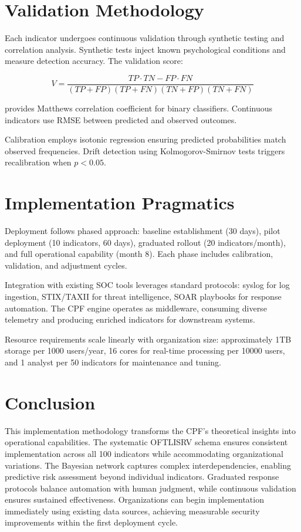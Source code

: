 \documentclass[10pt, twocolumn]{article}
\begin{document}
\section{Validation Methodology}

Each indicator undergoes continuous validation through synthetic testing and correlation analysis. Synthetic tests inject known psychological conditions and measure detection accuracy. The validation score:

$$V = \frac{TP \cdot TN - FP \cdot FN}{(TP + FP)(TP + FN)(TN + FP)(TN + FN)}$$

provides Matthews correlation coefficient for binary classifiers. Continuous indicators use RMSE between predicted and observed outcomes.

Calibration employs isotonic regression ensuring predicted probabilities match observed frequencies. Drift detection using Kolmogorov-Smirnov tests triggers recalibration when $p < 0.05$.

\section{Implementation Pragmatics}

Deployment follows phased approach: baseline establishment (30 days), pilot deployment (10 indicators, 60 days), graduated rollout (20 indicators/month), and full operational capability (month 8). Each phase includes calibration, validation, and adjustment cycles.

Integration with existing SOC tools leverages standard protocols: syslog for log ingestion, STIX/TAXII for threat intelligence, SOAR playbooks for response automation. The CPF engine operates as middleware, consuming diverse telemetry and producing enriched indicators for downstream systems.

Resource requirements scale linearly with organization size: approximately 1TB storage per 1000 users/year, 16 cores for real-time processing per 10000 users, and 1 analyst per 50 indicators for maintenance and tuning.

\section{Conclusion}

This implementation methodology transforms the CPF's theoretical insights into operational capabilities. The systematic OFTLISRV schema ensures consistent implementation across all 100 indicators while accommodating organizational variations. The Bayesian network captures complex interdependencies, enabling predictive risk assessment beyond individual indicators. Graduated response protocols balance automation with human judgment, while continuous validation ensures sustained effectiveness. Organizations can begin implementation immediately using existing data sources, achieving measurable security improvements within the first deployment cycle.
\end{document}
